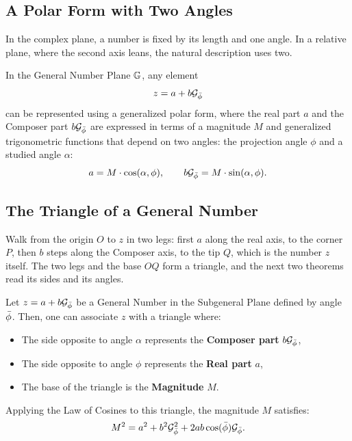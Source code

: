 \subsection{A Polar Form with Two Angles}\label{subsec:two-angle-polar}

In the complex plane, a number is fixed by its length and one angle. In a relative plane, where the second axis leans, the natural description uses two.

\begin{definition}\label{def:general-polar}
In the General Number Plane $\mathbb{G}$, any element
\[
z = a + b\mathcal{G}_{\bar{\phi}}
\]
can be represented using a generalized polar form, where the real part $a$ and the Composer part $b\mathcal{G}_{\bar{\phi}}$ are expressed in terms of a magnitude $M$ and generalized trigonometric functions that depend on two angles: the projection angle $\phi$ and a studied angle $\alpha$:
\[
a = M \cdot \cos(\alpha, \phi), \qquad b\mathcal{G}_{\bar{\phi}} = M \cdot \sin(\alpha, \phi) .
\]
\end{definition}

\subsection{The Triangle of a General Number}\label{subsec:gn-triangle}

Walk from the origin $O$ to $z$ in two legs: first $a$ along the real axis, to the corner $P$, then $b$ steps along the Composer axis, to the tip $Q$, which is the number $z$ itself. The two legs and the base $OQ$ form a triangle, and the next two theorems read its sides and its angles.

\begin{theorem}\label{thm:triangle}
Let $z = a + b\mathcal{G}_{\bar{\phi}}$ be a General Number in the Subgeneral Plane defined by angle $\bar{\phi}$. Then, one can associate $z$ with a triangle where:
\begin{itemize}
  \item The side opposite to angle $\alpha$ represents the \textbf{Composer part} $b\mathcal{G}_{\bar{\phi}}$,
  \item The side opposite to angle $\phi$ represents the \textbf{Real part} $a$,
  \item The base of the triangle is the \textbf{Magnitude} $M$.
\end{itemize}
Applying the Law of Cosines to this triangle, the magnitude $M$ satisfies:
\[
M^2 = a^2 + b^2\mathcal{G}_{\bar{\phi}}^2 + 2ab\cos(\bar{\phi})\mathcal{G}_{\bar{\phi}} .
\]
\end{theorem}

